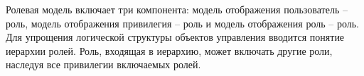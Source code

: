 \begin{enumerate}
	Ролевая модель включает три компонента: модель отображения пользователь -- роль, модель отображения привилегия -- роль и модель отображения роль -- роль. Для упрощения логической структуры объектов управления вводится понятие иерархии ролей. Роль, входящая в иерархию, может включать другие роли, наследуя все привилегии включаемых
	ролей.
\end{enumerate}